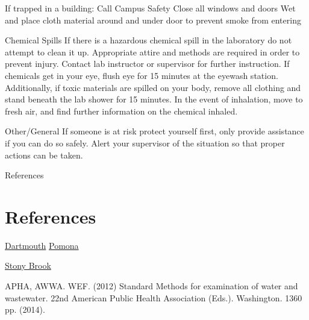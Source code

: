 \documentclass[12pt]{../SOP2}
\begin{document}
If trapped in a building:
Call Campus Safety
Close all windows and doors
Wet and place cloth material around and under door to prevent smoke from entering 
 

Chemical Spills
If there is a hazardous chemical spill in the laboratory do not attempt to clean it up.  Appropriate attire and methods are required in order to prevent injury.  Contact lab instructor or supervisor for further instruction. If chemicals get in your eye, flush eye for 15 minutes at the eyewash station.  Additionally, if toxic materials are spilled on your body, remove all clothing and stand beneath the lab shower for 15 minutes. In the event of inhalation, move to fresh air, and find further information on the chemical inhaled.  

Other/General
If someone is at risk protect yourself first, only provide assistance if you can do so safely.  Alert your supervisor of the situation so that proper actions can be taken.

References





\section{References}

\NP \href{http://emergency.cdc.gov/disasters/earthquakes/prepared.asp}
\href{https://www.dartmouth.edu/~chemlab/info/safety/hazards.html}{Dartmouth}
\href{https://sakai.claremont.edu/access/content/group/CX_mtg_87013/Project%201%3A%20Lab%20and%20Field%20Safety/Lessons%20Learned/Lesson_Learned_Report.pdf}{Pomona}

\href{http://naples.cc.sunysb.edu/Admin/HRSForms.nsf/pub/EHSD0215/$FILE/EHSD0215.pdf}{Stony Brook}

\NP APHA, AWWA. WEF. (2012) Standard Methods for examination of water and wastewater. 22nd American Public Health Association (Eds.). Washington. 1360 pp. (2014).
\end{document}
